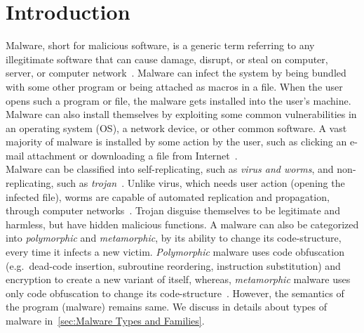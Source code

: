 \chapter{Introduction}\label{chapter:introduction}
Malware, short for malicious software, is a generic term referring to any illegitimate software that can cause damage, disrupt, or steal on computer, server, or computer network~\cite[]{ciscodif}.
Malware can infect the system by being bundled with some other program or being attached as macros in a file.
When the user opens such a program or file, the malware gets installed into the user's machine.
Malware can also install themselves by exploiting some common vulnerabilities in an operating system (OS), a network device, or other common software.
A vast majority of malware is installed by some action by the user, such as clicking an e-mail attachment or downloading a file from Internet~\cite[]{ciscodif}.\\
Malware can be classified into self-replicating, such as \emph{virus and worms}, and non-replicating, such as \emph{trojan}~\cite[]{malsoft}.
Unlike virus, which needs user action (opening the infected file), worms are capable of automated replication and propagation, through computer networks~\cite[]{malsoft}.
Trojan disguise themselves to be legitimate and harmless, but have hidden malicious functions.
A malware can also be categorized into \emph{polymorphic} and \emph{metamorphic}, by its ability to change its code-structure, every time it infects a new victim.
\emph{Polymorphic} malware uses code obfuscation (e.g.\ dead-code insertion, subroutine reordering, instruction substitution) and encryption to create a new variant of itself, whereas,
\emph{metamorphic} malware uses only code obfuscation to change its code-structure~\cite[]{rad2011evolution,rad2012camouflage}.
However, the semantics of the program (malware) remains same.
We discuss in details about types of malware in~\autoref{sec:Malware Types and Families}.\\
